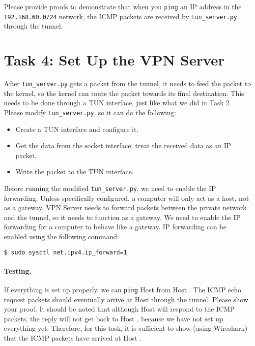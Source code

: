 Please provide proofs to demonstrate that when you \texttt{ping}
an IP address in the \texttt{192.168.60.0/24} network, the ICMP packets 
are received by \texttt{tun\_server.py} through the tunnel. 
 



\section{Task 4: Set Up the VPN Server}


After \texttt{tun\_server.py} gets a packet from the 
tunnel, it needs to feed the packet to the kernel, so
the kernel can route the packet towards its final destination. 
This needs to be done through a TUN interface, just like what 
we did in Task 2. Please modify \texttt{tun\_server.py}, so it 
can do the following: 


\begin{itemize}[noitemsep]
\item Create a TUN interface and configure it.

\item Get the data from the socket interface; treat the received data 
as an IP packet.

\item Write the packet to the TUN interface.

\end{itemize}
 

Before running the modified \texttt{tun\_server.py}, we need to enable the 
IP forwarding. 
Unless specifically configured, a computer will only act as a host, 
not as a gateway. VPN Server needs to forward packets between the private network and the 
tunnel, so it needs to function as a gateway. We need to  
enable the IP forwarding for a computer to behave like a gateway. 
IP forwarding can be enabled
using the following command:

\begin{lstlisting}
$ sudo sysctl net.ipv4.ip_forward=1
\end{lstlisting}

 

\paragraph{Testing.} If everything is set up properly, we can \texttt{ping}
Host \hostv from Host \hostu. The ICMP echo request packets should eventually arrive at Host \hostv
through the tunnel. 
Please show your proof. 
It should be noted that although Host \hostv will respond to the ICMP packets,
the reply will not get back to Host \hostu, because we have not set up everything yet. 
Therefore, for this task, it is sufficient to
show (using Wireshark) that the ICMP packets have arrived at Host \hostv.






